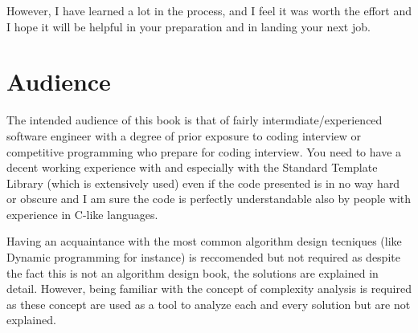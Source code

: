 However, I have learned a lot in the process, and I feel it was worth the effort and I hope it will be helpful in your preparation and in landing your next job. 

\section*{Audience}
The intended audience of this book is that of fairly intermdiate/experienced software engineer with a degree of prior exposure to coding interview or competitive programming who prepare for coding interview.
You need to have a decent working experience with \CC and especially with the Standard Template Library (which is extensively used) even if the code presented is in no way hard or obscure \CC and I am sure the code is perfectly understandable also by people with experience in C-like languages. 

Having an acquaintance with the most common algorithm design tecniques (like Dynamic programming for instance) is reccomended but not required as despite the fact this is not an algorithm design book, the solutions are explained in detail. However, being familiar with the concept of complexity analysis is required as these concept are used as a tool to analyze each and every solution but are not explained.



